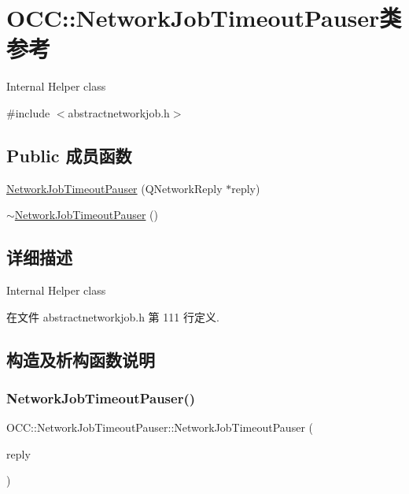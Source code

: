 \hypertarget{class_o_c_c_1_1_network_job_timeout_pauser}{}\section{O\+CC\+:\+:Network\+Job\+Timeout\+Pauser类 参考}
\label{class_o_c_c_1_1_network_job_timeout_pauser}


Internal Helper class  




{\ttfamily \#include $<$abstractnetworkjob.\+h$>$}

\subsection*{Public 成员函数}
\begin{DoxyCompactItemize}
\item 
\hyperlink{class_o_c_c_1_1_network_job_timeout_pauser_ade0f28241d33458f041f410af5db6851}{Network\+Job\+Timeout\+Pauser} (Q\+Network\+Reply $\ast$reply)
\item 
\hyperlink{class_o_c_c_1_1_network_job_timeout_pauser_a45af9a8694b9a3b7b459fe9ac69c44b3}{$\sim$\+Network\+Job\+Timeout\+Pauser} ()
\end{DoxyCompactItemize}


\subsection{详细描述}
Internal Helper class 

在文件 abstractnetworkjob.\+h 第 111 行定义.



\subsection{构造及析构函数说明}
\mbox{\label{class_o_c_c_1_1_network_job_timeout_pauser_ade0f28241d33458f041f410af5db6851}} 
\subsubsection{\texorpdfstring{Network\+Job\+Timeout\+Pauser()}{NetworkJobTimeoutPauser()}}
{\footnotesize\ttfamily O\+C\+C\+::\+Network\+Job\+Timeout\+Pauser\+::\+Network\+Job\+Timeout\+Pauser (\begin{DoxyParamCaption}\item[{Q\+Network\+Reply $\ast$}]{reply }\end{DoxyParamCaption})}

